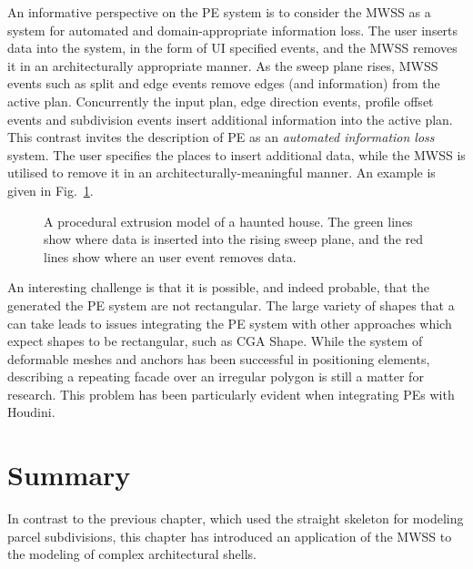 An informative perspective on the PE system is to consider the MWSS as a system for automated and domain-appropriate information loss. The user inserts data into the system, in the form of UI specified events, and the MWSS removes it in an architecturally appropriate manner. As the sweep plane rises, MWSS events such as split and edge events remove edges (and information) from the active plan. Concurrently the input plan, edge direction events, profile offset events and subdivision events insert additional information into the active plan. This contrast invites the description of PE as an \emph{automated information loss} system. The user specifies the places to insert additional data, while the MWSS is utilised to remove it in an architecturally-meaningful manner. An example is given in  Fig.~\ref{fig:complexity_reduction}.

\begin{figure}
  \centering
  \def\svgwidth{0.7\columnwidth}
  
  \caption[The PE as an automated data-loss system]{\label{fig:complexity_reduction} A procedural extrusion model of a haunted house. The green lines show where data is inserted into the rising sweep plane, and the red lines show where an user event removes data.}
\end{figure}

An interesting challenge is that it is possible, and indeed probable, that the \facades{} generated the PE system are not rectangular. The large variety of shapes that a \facade{} can take leads to issues integrating the PE system with other approaches which expect shapes to be rectangular, such as CGA Shape. While the system of deformable meshes and anchors has been successful in positioning elements, describing a repeating facade over an irregular polygon is still a matter for research. This problem has been particularly evident when integrating PEs with Houdini.

\FloatBarrier
\section{Summary}

In contrast to the previous chapter, which used the straight skeleton for modeling parcel subdivisions, this chapter has introduced an application of the MWSS to the modeling of complex architectural shells. 



